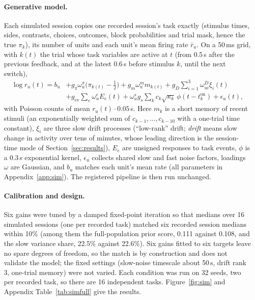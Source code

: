 \documentclass{article}
\begin{document}
\paragraph{Generative model.} Each simulated session copies one recorded session's task exactly (stimulus times,
sides, contrasts, choices, outcomes, block probabilities and trial mask, hence the true $\pi_k$), its number of units
and each unit's mean firing rate $\bar r_u$. On a 50\,ms grid, with $k(t)$ the trial whose task variables are active at $t$
(from 0.5\,s after the previous feedback, and at the latest 0.6\,s before stimulus $k$, until the next switch),
\begin{align}
  \log r_u(t) = b_u &+ g_\pi \omega^\pi_u \big(\pi_{k(t)} - \tfrac12\big) + g_m \omega^m_u m_{k(t)}
  + g_D \textstyle\sum_{i=1}^{3} \omega^D_{ui} \xi_i(t) \nonumber\\
  &+ g_{\mathrm{ev}} \textstyle\sum_e \omega^e_u E_e(t)
  + \omega^s_u g_s \textstyle\sum_k c_k \sqrt{\kappa_k}\, \phi(t - t^{\mathrm{on}}_k) + \epsilon_u(t) ,
  \label{eq:gen}
\end{align}
with Poisson counts of mean $r_u(t)\cdot 0.05$\,s. Here $m_k$ is a short memory of recent stimuli (an exponentially
weighted sum of $c_{k-1},\dots,c_{k-10}$ with a one-trial time constant), $\xi_i$ are three slow drift processes
(``low-rank'' drift; \emph{drift} means slow change in activity over tens of minutes, whose leading direction is the
session-time mode of Section~\ref{sec:results}), $E_e$ are unsigned responses to task events, $\phi$ is a 0.3\,s
exponential kernel, $\epsilon_u$ collects shared slow and fast noise factors, loadings $\omega$ are Gaussian, and $b_u$
matches each unit's mean rate (all parameters in Appendix~\ref{app:sim}). The registered pipeline is then run unchanged.

\paragraph{Calibration and design.} Six gains were tuned by a damped fixed-point iteration so that medians over 16
simulated sessions (one per recorded task) matched six recorded session medians within 10\% (among them the full-population
prior score, 0.111 against 0.108, and the slow variance share, 22.5\% against 22.6\%). Six gains fitted to
six targets leave no spare degrees of freedom, so the match is by construction and does not validate the model; the
fixed settings (slow-noise timescale about 50\,s, drift rank 3, one-trial memory) were not varied. Each condition was
run on 32 seeds, two per recorded task, so there are 16 independent tasks. Figure~\ref{fig:sim} and
Appendix Table~\ref{tab:simfull} give the results.
\end{document}
